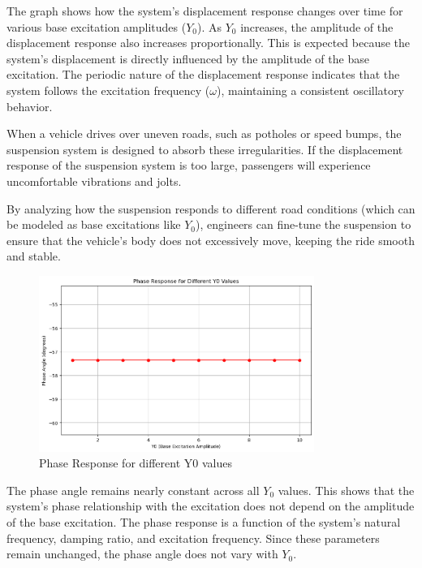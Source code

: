 \documentclass[12pt,a4paper]{article}
\begin{document}
The graph shows how the system's displacement response changes over time for various base excitation amplitudes (\(Y_0\)). As \(Y_0\) increases, the amplitude of the displacement response also increases proportionally. This is expected because the system's displacement is directly influenced by the amplitude of the base excitation. The periodic nature of the displacement response indicates that the system follows the excitation frequency (\(\omega\)), maintaining a consistent oscillatory behavior.

When a vehicle drives over uneven roads, such as potholes or speed bumps, the suspension system is designed to absorb these irregularities. If the displacement response of the suspension system is too large, passengers will experience uncomfortable vibrations and jolts.

By analyzing how the suspension responds to different road conditions (which can be modeled as base excitations like \(Y_0\)), engineers can fine-tune the suspension to ensure that the vehicle's body does not excessively move, keeping the ride smooth and stable.




{\vspace{10pt}}

\begin{figure}[H]
    \centering
    \includegraphics[width=0.8\textwidth]{phase_resp.png} 
    \caption{Phase Response for different Y0 values}
    \label{fig:system}
\end{figure}
{\vspace{10pt}}
The phase angle remains nearly constant across all \(Y_0\) values. This shows that the system's phase relationship with the excitation does not depend on the amplitude of the base excitation. The phase response is a function of the system's natural frequency, damping ratio, and excitation frequency. Since these parameters remain unchanged, the phase angle does not vary with \(Y_0\).
\end{document}
